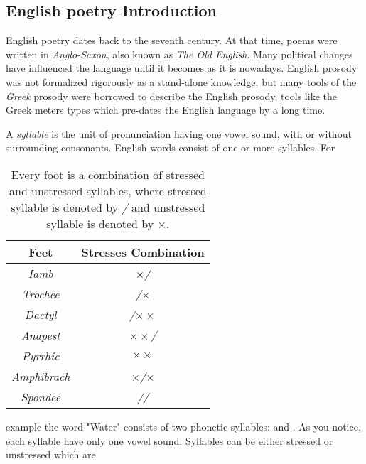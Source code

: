 \documentclass[12pt]{report}
\begin{document}
\subsection*{English poetry Introduction}
English poetry dates back to the seventh century. At that time, poems were
written in \textit{Anglo-Saxon}, also known as \textit{The Old English}. Many
political changes have influenced the language until it becomes as it is
nowadays. English prosody was not formalized rigorously as a stand-alone
knowledge, but many tools of the \textit{Greek} prosody were borrowed to describe
the English prosody, tools like the Greek meters types which pre-dates the
English language by a long time.

A \textit{syllable} is the unit of pronunciation having one vowel sound, with or
without surrounding consonants. English words consist of one or more syllables.
For
\begin{table}[!t]
  \centering
  \begin{tabular}{|c | c|} 
    \hline
    \textbf{{Feet}}     & \textbf{{Stresses Combination}}\\ 
    \hline
\textit{Iamb} & $\times$\textit{/}\\             %
\textit{Trochee}& \textit{/}$\times$\\           %
\textit{Dactyl} & \textit{/}$\times\times$\\     %
\textit{Anapest}& $\times\times$\textit{/}\\     %
\textit{Pyrrhic}& $\times\times$\\               %
\textit{Amphibrach}& $\times$\textit{/}$\times$\\%
\textit{Spondee}& \textit{/}\textit{/}\\
    \hline
  \end{tabular}
  \caption{Every foot is a combination of stressed and unstressed syllables,
where stressed syllable is denoted by \textit{/} and unstressed syllable is
denoted by $\times$.}
\label{feet}
\end{table}
example the word "Water"  consists of two phonetic syllables:
and . As you notice, each syllable have only one vowel
sound.
Syllables can be either stressed or unstressed which are
\end{document}
